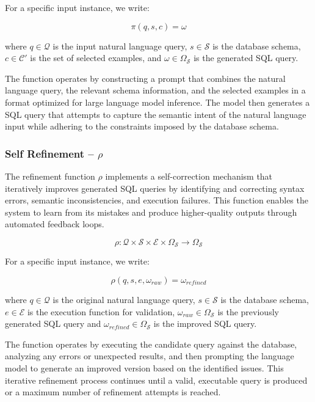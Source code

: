 \vspace{0.5em}

For a specific input instance, we write:

$$
\pi(q, s, c) = \omega
$$

\vspace{0.5em}

where $q \in \mathcal{Q}$ is the input natural language query, $s \in \mathcal{S}$ is
the database schema, $c \in \mathcal{C}'$ is the set of selected examples,
and $\omega \in \Omega_{\mathcal{S}}$ is the generated SQL query.

The function operates by constructing a prompt that combines the natural language
query, the relevant schema information, and the selected examples in a format
optimized for large language model inference. The model then generates a SQL query
that attempts to capture the semantic intent of the natural language input while
adhering to the constraints imposed by the database schema.

\subsubsection{Self Refinement – $\rho$}\label{design:refinement-function}

The refinement function $\rho$ implements a self-correction mechanism that iteratively
improves generated SQL queries by identifying and correcting syntax errors,
semantic inconsistencies, and execution failures. This function enables the system
to learn from its mistakes and produce higher-quality outputs through automated
feedback loops.

$$
\rho: \mathcal{Q} \times \mathcal{S} \times \mathcal{E} \times \Omega_{\mathcal{S}} \rightarrow \Omega_{\mathcal{S}}
$$

\vspace{0.5em}

For a specific input instance, we write:

$$
\rho(q, s, e, \omega_{raw}) = \omega_{refined}
$$

\vspace{0.5em}

where $q \in \mathcal{Q}$ is the original natural language query, $s \in \mathcal{S}$
is the database schema, $e \in \mathcal{E}$ is the execution function for
validation, $\omega_{raw} \in \Omega_{\mathcal{S}}$ is the previously generated SQL
query and $\omega_{refined} \in \Omega_{\mathcal{S}}$ is the improved SQL query.

The function operates by executing the candidate query against the database, analyzing
any errors or unexpected results, and then prompting the language model to generate
an improved version based on the identified issues. This iterative refinement
process continues until a valid, executable query is produced or a maximum number
of refinement attempts is reached.

